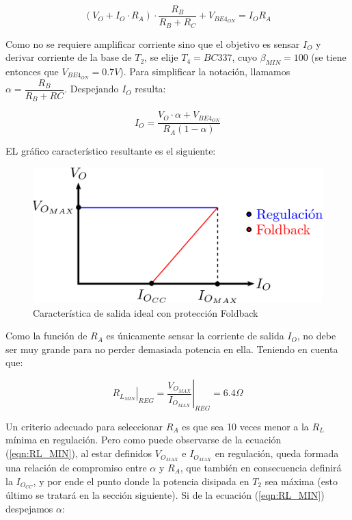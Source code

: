 $$(V_O + I_O \cdot R_A)\cdot \frac{R_B}{R_B+R_C} + V_{BE4_{ON}} = I_OR_A$$

Como no se requiere amplificar corriente sino que el objetivo es sensar $I_O$ y derivar corriente de la base de $T_2$, se elije $T_4 = BC337$, cuyo $\beta_{MIN} = 100$ (se tiene entonces que $V_{BE4_{ON}} = 0.7V$). Para simplificar la notaci\'on, llamamos $\alpha = \dfrac{R_B}{R_B+RC}$. Despejando $I_O$ resulta:

$$I_O = \frac{V_O \cdot \alpha + V_{BE4_{ON}}}{R_A(1-\alpha)}$$

EL gr\'afico caracter\'istico resultante es el siguiente:

\begin{figure}[!h]
\begin{centering}
\includegraphics[scale=0.5]{Imagenes/FB_Generico.png}
\par\end{centering}
\caption{Caracter\'istica de salida ideal con protecci\'on Foldback}

\end{figure}

Como la funci\'on de $R_A$ es \'unicamente sensar la corriente de salida $I_O$, no debe ser muy grande para no perder demasiada potencia en ella. Teniendo en cuenta que:

\begin{equation}
\left. R_{L_{MIN}} \right|_{REG} = \left. \frac{V_{O_{MAX}}}{I_{O_{MAX}}} \right|_{REG} = 6.4\Omega
\label{eqn:RL_MIN}
\end{equation}

Un criterio adecuado para seleccionar $R_A$ es que sea 10 veces menor a la $R_L$ m\'inima en regulaci\'on. Pero como puede observarse de la ecuaci\'on (\ref{eqn:RL_MIN}), al estar definidos $V_{O_{MAX}}$ e $I_{O_{MAX}}$ en regulaci\'on, queda formada una relaci\'on de compromiso entre $\alpha$ y $R_A$, que tambi\'en en consecuencia definir\'a la $I_{O_{CC}}$, y por ende el punto donde la potencia disipada en $T_2$ sea m\'axima (esto \'ultimo se tratar\'a en la secci\'on siguiente). Si de la ecuaci\'on (\ref{eqn:RL_MIN}) despejamos $\alpha$:

